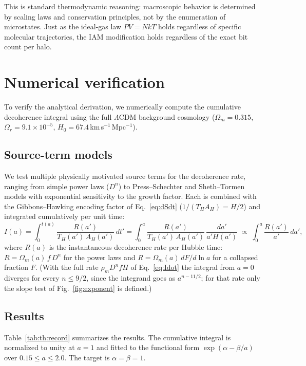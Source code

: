 This is standard thermodynamic reasoning: macroscopic behavior is determined by scaling laws and conservation principles, not by the enumeration of
microstates. Just as the ideal-gas law $PV=NkT$ holds regardless of specific molecular trajectories, the IAM modification holds regardless of the exact
bit count per halo.

\section{Numerical verification}\label{sec:numerics}
To verify the analytical derivation, we numerically compute the cumulative decoherence integral using the full $\Lambda$CDM background cosmology
($\Omega_m=0.315$, $\Omega_r=9.1\times10^{-5}$, $H_0=67.4$\,km\,s$^{-1}$\,Mpc$^{-1}$). \calc

\subsection{Source-term models}
We test multiple physically motivated source terms for the decoherence rate, ranging from simple power laws ($D^n$) to Press--Schechter and
Sheth--Tormen models with exponential sensitivity to the growth factor. Each is combined with the Gibbons--Hawking encoding factor of
Eq.~\eqref{eq:dSdt} ($1/(T_HA_H)=H/2$) and integrated cumulatively per unit time:
\begin{equation}I(a)=\int_0^{t(a)}\frac{R(a')}{T_H(a')\,A_H(a')}\,dt'=\int_0^a\frac{R(a')}{T_H(a')\,A_H(a')}\,\frac{da'}{a'H(a')}\;\propto\;\int_0^a\frac{R(a')}{a'}\,da',\label{eq:th:Iint}\end{equation}
where $R(a)$ is the instantaneous decoherence rate per Hubble time: $R=\Omega_m(a)\,f\,D^n$ for the power laws and $R=\Omega_m(a)\,dF/d\ln a$ for a
collapsed fraction $F$. (With the full rate $\rho_mD^nfH$ of Eq.~\eqref{eq:Idot} the integral from $a=0$ diverges for every $n\le9/2$, since the integrand goes as
$a^{n-11/2}$; for that rate only the slope test of Fig.~\ref{fig:exponent} is defined.) \derived{}

\subsection{Results}
Table~\ref{tab:th:record} summarizes the results. The cumulative integral is normalized to unity at $a=1$ and fitted to the functional form
$\exp(\alpha-\beta/a)$ over $0.15\le a\le2.0$. The target is $\alpha=\beta=1$.

